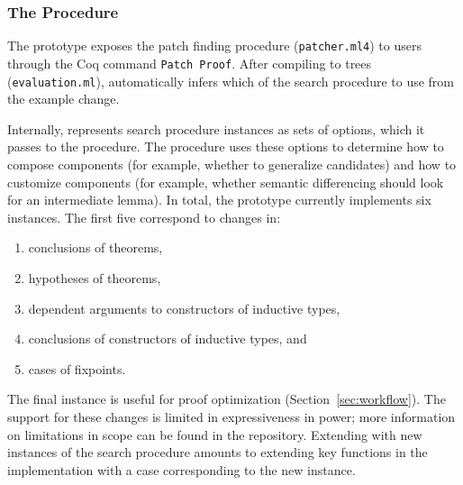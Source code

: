 \subsubsection{The Procedure}
\label{sec:pumpkin-impl-procedure}

The \sysname prototype exposes the patch finding procedure (\lstinline{patcher.ml4}) to users through the Coq command \lstinline{Patch Proof}. 
After compiling to trees (\lstinline{evaluation.ml}),
\sysname automatically infers which  of the search procedure to use from the example change. %


Internally, \sysname represents search procedure instances as sets of options,
which it passes to the procedure. The procedure uses these options to determine
how to compose components (for example, whether to generalize candidates) 
and how to customize components (for example, whether semantic differencing should look for an intermediate lemma).
In total, the \sysname prototype currently implements six instances.
The first five correspond to changes in:

\begin{enumerate}
\item conclusions of theorems,
\item hypotheses of theorems,
\item dependent arguments to constructors of inductive types, 
\item conclusions of constructors of inductive types, and
\item cases of fixpoints.
\end{enumerate}
The final instance is useful for proof optimization (Section~\ref{sec:workflow}).
The support for these changes is limited in expressiveness in power;
more information on limitations in scope can be found in the repository. %
Extending \sysname with new instances of the search procedure amounts to extending key functions in the implementation
with a case corresponding to the new instance.

